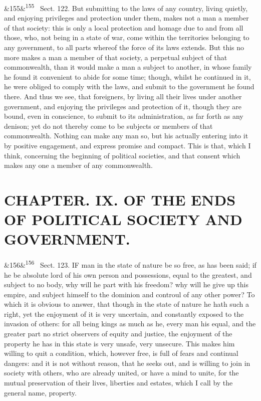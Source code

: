 \documentclass[12pt]{article}
\newcommand{\para}[1][]{\par\noindent\ifx&#1&\else\textsuperscript{\footnotesize #1}~\fi}
\begin{document}
\para[155] Sect. 122. But submitting to the laws of any country, living quietly, and enjoying privileges and protection under them, makes not a man a member of that society: this is only a local protection and homage due to and from all those, who, not being in a state of war, come within the territories belonging to any government, to all parts whereof the force of its laws extends. But this no more makes a man a member of that society, a perpetual subject of that commonwealth, than it would make a man a subject to another, in whose family he found it convenient to abide for some time; though, whilst he continued in it, he were obliged to comply with the laws, and submit to the government he found there. And thus we see, that foreigners, by living all their lives under another government, and enjoying the privileges and protection of it, though they are bound, even in conscience, to submit to its administration, as far forth as any denison; yet do not thereby come to be subjects or members of that commonwealth. Nothing can make any man so, but his actually entering into it by positive engagement, and express promise and compact. This is that, which I think, concerning the beginning of political societies, and that consent which makes any one a member of any commonwealth.

\section*{CHAPTER. IX. OF THE ENDS OF POLITICAL SOCIETY AND GOVERNMENT.}

\para[156] Sect. 123. IF man in the state of nature be so free, as has been said; if he be absolute lord of his own person and possessions, equal to the greatest, and subject to no body, why will he part with his freedom? why will he give up this empire, and subject himself to the dominion and controul of any other power? To which it is obvious to answer, that though in the state of nature he hath such a right, yet the enjoyment of it is very uncertain, and constantly exposed to the invasion of others: for all being kings as much as he, every man his equal, and the greater part no strict observers of equity and justice, the enjoyment of the property he has in this state is very unsafe, very unsecure. This makes him willing to quit a condition, which, however free, is full of fears and continual dangers: and it is not without reason, that he seeks out, and is willing to join in society with others, who are already united, or have a mind to unite, for the mutual preservation of their lives, liberties and estates, which I call by the general name, property.
\end{document}
